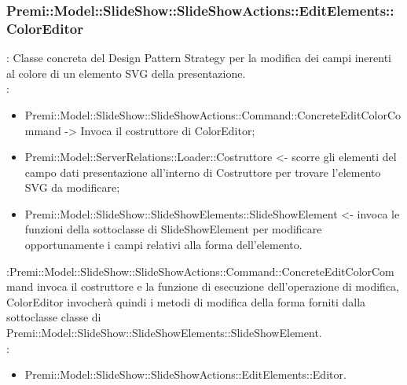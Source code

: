 {            \subsubsection{Premi::Model::SlideShow::SlideShowActions::EditElements::ColorEditor}{
				\textbf{\tipo}: Classe concreta del Design Pattern Strategy per la modifica dei campi inerenti al colore di un elemento SVG della presentazione.\\	
				\textbf{\relaz}: 
				\begin{itemize}
					\item Premi::Model::SlideShow::SlideShowActions::Command::ConcreteEditColorCommand -> Invoca il costruttore di ColorEditor;
                    \item Premi::Model::ServerRelations::Loader::Costruttore <- scorre gli elementi del campo dati presentazione all'interno di Costruttore per trovare l'elemento SVG da modificare; 
                    \item Premi::Model::SlideShow::SlideShowElements::SlideShowElement <- invoca le funzioni della sottoclasse di SlideShowElement per modificare opportunamente i campi relativi alla forma dell’elemento.
				\end{itemize}	\textbf{\interfacce}:Premi::Model::SlideShow::SlideShowActions::Command::ConcreteEditColorCommand invoca il costruttore e la funzione di esecuzione dell’operazione di modifica, ColorEditor invocherà quindi i metodi di modifica della forma forniti dalla sottoclasse classe di Premi::Model::SlideShow::SlideShowElements::SlideShowElement.\\
                \textbf{\base}: 
                    \begin{itemize}
                    \item Premi::Model::SlideShow::SlideShowActions::EditElements::Editor.
                    \end{itemize}
                    }
}
